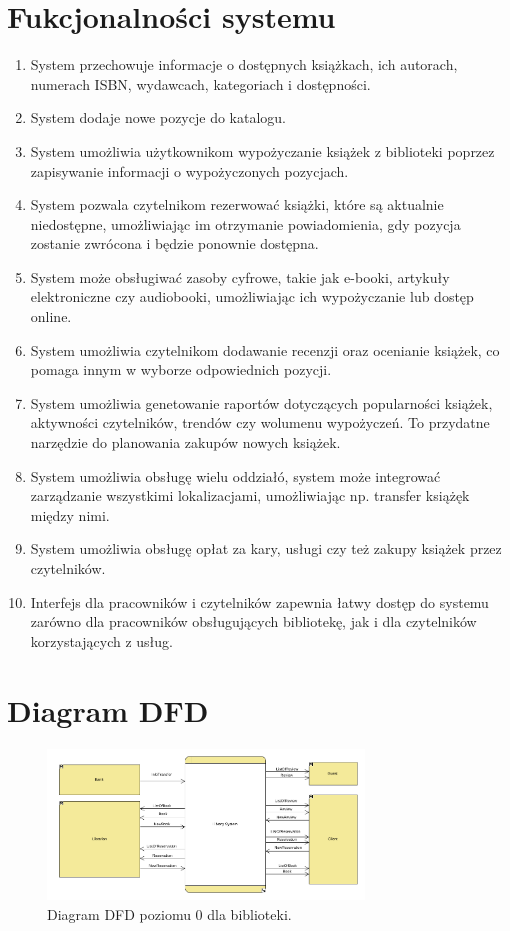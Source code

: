 \documentclass[12pt]{article}
\begin{document}
\section{Fukcjonalności systemu}
\begin{enumerate}
    \item System przechowuje informacje o dostępnych książkach, ich autorach, numerach ISBN, wydawcach, kategoriach i dostępności.
    \item System dodaje nowe pozycje do katalogu.
    \item System umożliwia użytkownikom wypożyczanie książek z biblioteki poprzez zapisywanie informacji o wypożyczonych pozycjach.
    \item System pozwala czytelnikom rezerwować książki, które są aktualnie niedostępne, umożliwiając im otrzymanie powiadomienia, gdy pozycja zostanie zwrócona i będzie ponownie dostępna.
    \item System może obsługiwać zasoby cyfrowe, takie jak e-booki, artykuły elektroniczne czy audiobooki, umożliwiając ich wypożyczanie lub dostęp online.
    \item System umożliwia czytelnikom dodawanie recenzji oraz ocenianie książek, co pomaga innym w wyborze odpowiednich pozycji.
    \item System umożliwia genetowanie raportów dotyczących popularności książek, aktywności czytelników, trendów czy wolumenu wypożyczeń. To przydatne narzędzie do planowania zakupów nowych książek.
    \item System umożliwia obsługę wielu oddziałó, system może integrować zarządzanie wszystkimi lokalizacjami, umożliwiając np. transfer książęk między nimi.
    \item System umożliwia obsługę opłat za kary, usługi czy też zakupy książek przez czytelników.
    \item Interfejs dla pracowników i czytelników zapewnia łatwy dostęp do systemu zarówno dla pracowników obsługujących bibliotekę, jak i dla czytelników korzystających z usług.
\end{enumerate}
\newpage
\section{Diagram DFD}
\begin{figure}[!h]
    \centering
    \includegraphics[width=0.75\textwidth]{Schemat}
    \caption{Diagram DFD  poziomu 0 dla biblioteki.}
\end{figure}
\end{document}
